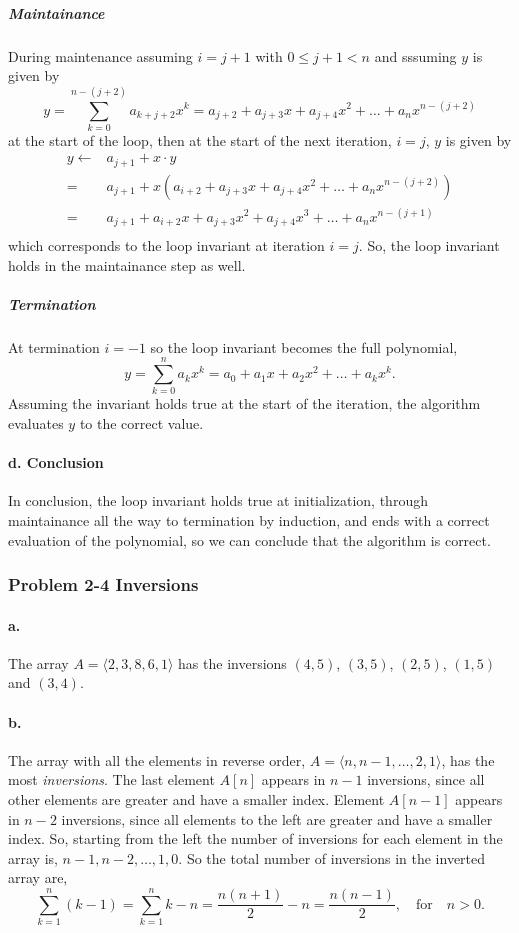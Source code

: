 \documentclass{article}
\begin{document}
\subparagraph{Maintainance} During maintenance assuming $i = j+1$ with $0\leq j+1<n$ and sssuming $y$ is given by
\[
y = \sum_{k=0}^{n-(j+2)}a_{k+j+2}x^k = a_{j+2} + a_{j+3}x + a_{j+4}x^2 + \ldots + a_nx^{n-(j+2)}
\]
at the start of the loop, then at the start of the next iteration, $i=j$, $y$ is given by
\begin{equation*}
\begin{split}
y \gets & a_{j+1} + x\cdot y \\
      = & a_{j+1} + x\left(a_{i+2} + a_{j+3}x + a_{j+4}x^2 + \ldots + a_nx^{n-(j+2)} \right)\\
      = & a_{j+1} + a_{i+2}x + a_{j+3}x^2 + a_{j+4}x^3 + \ldots + a_nx^{n-(j+1)}\\
\end{split}
\end{equation*}
which corresponds to the loop invariant at iteration $i=j$. So, the loop invariant holds in the maintainance step as well.

\subparagraph{Termination}
At termination $i=-1$ so the loop invariant becomes the full polynomial,
\[
y = \sum_{k=0}^{n}a_kx^k = a_0 + a_1x + a_2x^2 + \ldots + a_kx^k.
\]
Assuming the invariant holds true at the start of the iteration, the algorithm evaluates $y$ to the correct value.

\paragraph{d. Conclusion}
In conclusion, the loop invariant holds true at initialization, through maintainance all the way to termination by induction, and ends with a correct evaluation of the polynomial, so we can conclude that the algorithm is correct. 

\subsubsection*{Problem 2-4 Inversions}

\paragraph{a.}
The array $A=\langle 2, 3, 8, 6, 1 \rangle$ has the inversions $(4,5)$, $(3,5)$, $(2,5)$, $(1,5)$ and $(3,4)$.
\paragraph{b.}
The array with all the elements in reverse order, $A=\langle n, n-1, \ldots,2,1 \rangle$,  has the most \emph{inversions}. The last element $A[n]$ appears in $n-1$ inversions, since all other elements are greater and have a smaller index. Element $A[n-1]$ appears in $n-2$ inversions, since all elements to the left are greater and have a smaller index. So, starting from the left the number of inversions for each element in the array is, $n-1, n-2, \ldots, 1, 0$. So the total number of inversions in the inverted array are,
\[
\sum_{k=1}^{n} (k-1) = \sum_{k=1}^{n} k - n = \frac{n(n+1)}{2} - n = \frac{n(n - 1)}{2}, \quad \text{for} \quad n>0.
\]
\end{document}
